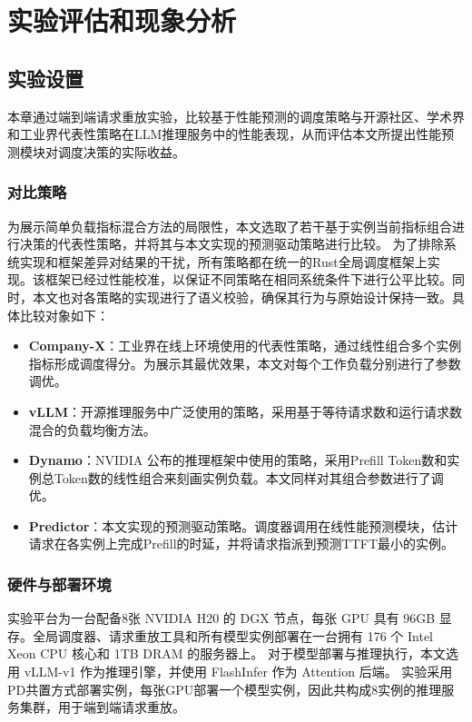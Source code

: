
\chapter{实验评估和现象分析}
\label{ch:evaluation}

\section{实验设置}
本章通过端到端请求重放实验，比较基于性能预测的调度策略与开源社区、学术界和工业界代表性策略在LLM推理服务中的性能表现，从而评估本文所提出性能预测模块对调度决策的实际收益。

\subsection{对比策略}
为展示简单负载指标混合方法的局限性，本文选取了若干基于实例当前指标组合进行决策的代表性策略，并将其与本文实现的预测驱动策略进行比较。
为了排除系统实现和框架差异对结果的干扰，所有策略都在统一的Rust全局调度框架上实现。该框架已经过性能校准，以保证不同策略在相同系统条件下进行公平比较。同时，本文也对各策略的实现进行了语义校验，确保其行为与原始设计保持一致。具体比较对象如下：

\begin{itemize}
  \item \textbf{Company-X}：工业界在线上环境使用的代表性策略，通过线性组合多个实例指标形成调度得分。为展示其最优效果，本文对每个工作负载分别进行了参数调优。
  \item \textbf{vLLM}：开源推理服务中广泛使用的策略，采用基于等待请求数和运行请求数混合的负载均衡方法。
  \item \textbf{Dynamo}：NVIDIA 公布的推理框架中使用的策略，采用Prefill Token数和实例总Token数的线性组合来刻画实例负载。本文同样对其组合参数进行了调优。
  \item \textbf{Predictor}：本文实现的预测驱动策略。调度器调用在线性能预测模块，估计请求在各实例上完成Prefill的时延，并将请求指派到预测TTFT最小的实例。
\end{itemize}

\subsection{硬件与部署环境}
实验平台为一台配备8张 NVIDIA H20 的 DGX 节点，每张 GPU 具有 96GB 显存。全局调度器、请求重放工具和所有模型实例部署在一台拥有 176 个 Intel Xeon CPU 核心和 1TB DRAM 的服务器上。
对于模型部署与推理执行，本文选用 vLLM-v1 作为推理引擎，并使用 FlashInfer 作为 Attention 后端。
实验采用PD共置方式部署实例，每张GPU部署一个模型实例，因此共构成8实例的推理服务集群，用于端到端请求重放。


